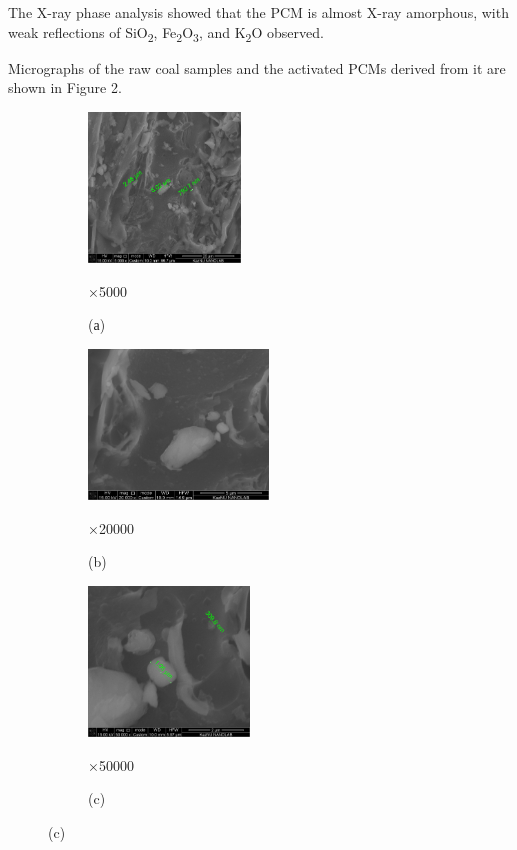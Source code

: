 The X-ray phase analysis showed that the PCM is almost X-ray amorphous,
with weak reflections of SiO\textsubscript{2},
Fe\textsubscript{2}O\textsubscript{3}, and K\textsubscript{2}O observed.

Micrographs of the raw coal samples and the activated PCMs derived from
it are shown in Figure 2.

\begin{figure}[H]
    \centering
    \begin{subfigure}[b]{0.32\textwidth}
        \centering
        \includegraphics[height=4cm]{assets/1090}
        \caption*{×5000}
        \caption*{(а)}
    \end{subfigure}
    \hfill
    \begin{subfigure}[b]{0.32\textwidth}
        \centering
        \includegraphics[height=4cm]{assets/1091}
        \caption*{×20000}
        \caption*{(b)}
    \end{subfigure}
    \hfill
    \begin{subfigure}[b]{0.32\textwidth}
        \centering
        \includegraphics[height=4cm]{assets/1092}
        \caption*{×50000}
        \caption*{(c)}
    \end{subfigure}
\end{figure}

